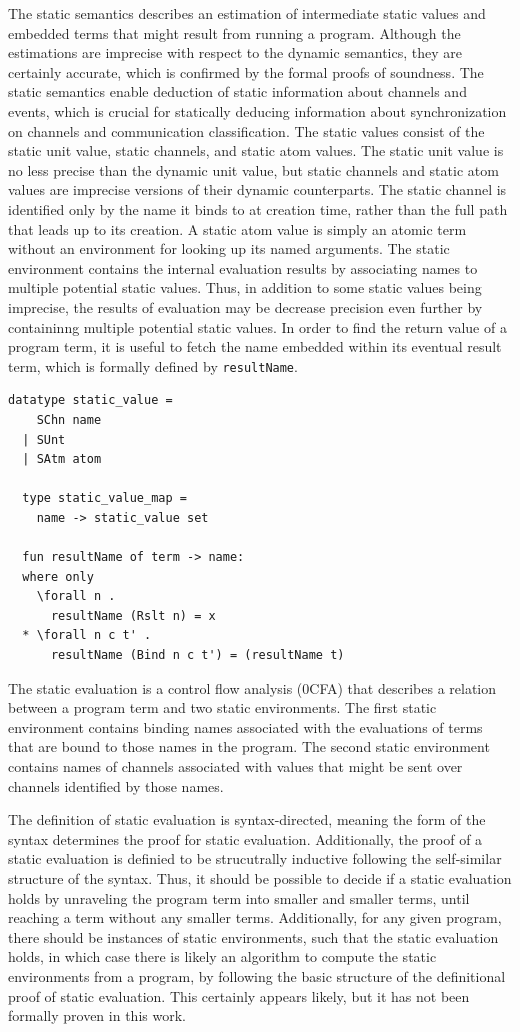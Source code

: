 \documentclass[letterpaper, 11pt]{extarticle}
\begin{document}
The static semantics describes an estimation of intermediate static values and embedded terms
that might result from running a program.  Although the estimations are imprecise with
respect to the dynamic semantics, they are certainly accurate,
which is confirmed by the formal proofs of soundness.
The static semantics enable deduction of static information about channels and events, which is
crucial for statically deducing information about synchronization on channels and
communication classification.
The static values consist of the static unit value, static channels, and static atom
values. The static unit value is no less precise than the dynamic unit value, but
static channels and static atom values are imprecise versions of their dynamic
counterparts. The static channel is identified only by the name it binds to at creation time,
rather than the full path that leads up to its creation.  A static atom value is simply an
atomic term without an environment for looking up its named arguments.  The static
environment contains the internal evaluation results by
associating names to multiple potential static values.
Thus, in addition to some static values being imprecise,
the results of evaluation may be decrease precision even further
by containinng multiple potential static values. 
In order to find the return value of a program term, it is useful to fetch the name
embedded within its eventual result term, which is formally defined by \lstinline{resultName}.

\begin{lstlisting}[language=logic, mathescape]
  datatype static_value =
    SChn name
  | SUnt
  | SAtm atom 

  type static_value_map =
    name -> static_value set

  fun resultName of term -> name:
  where only
    \forall n .
      resultName (Rslt n) = x
  * \forall n c t' . 
      resultName (Bind n c t') = (resultName t)
\end{lstlisting}

The static evaluation is a control flow analysis (0CFA)
that describes a relation between a program term and two static environments.
The first static environment contains binding names associated with the
evaluations of terms that are bound to those names in the program.
The second static environment contains names of channels associated
with values that might be sent over channels identified by those names.

The definition of static evaluation is syntax-directed, meaning the form of the syntax
determines the proof for static evaluation.  Additionally, the proof of a static evaluation
is definied to be strucutrally inductive following the self-similar structure of the syntax.
Thus, it should be possible to decide if a static evaluation holds
by unraveling the program term into smaller and smaller terms,
until reaching a term without any smaller terms.
Additionally, for any given program, there should be instances of static environments,
such that the static evaluation holds, in which case there is likely an
algorithm to compute the static environments from a program,
by following the basic structure of the definitional proof of static evaluation.
This certainly appears likely, but it has not been formally proven in this work.
\end{document}
